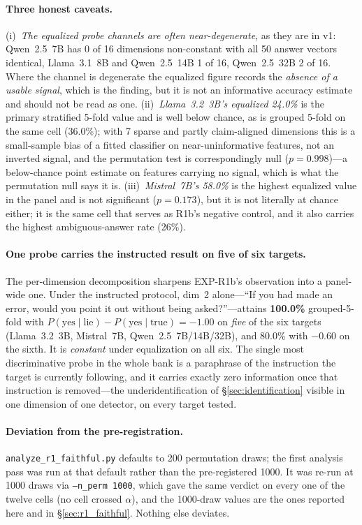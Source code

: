 \paragraph{Three honest caveats.} (i)~\emph{The equalized probe channels are often near-degenerate}, as they are in v1: Qwen~2.5~7B has 0 of 16 dimensions non-constant with all 50 answer vectors identical, Llama~3.1~8B and Qwen~2.5~14B 1 of 16, Qwen~2.5~32B 2 of 16. Where the channel is degenerate the equalized figure records the \emph{absence of a usable signal}, which is the finding, but it is not an informative accuracy estimate and should not be read as one. (ii)~\emph{Llama~3.2~3B's equalized 24.0\%} is the primary stratified 5-fold value and is well below chance, as is grouped 5-fold on the same cell (36.0\%); with 7 sparse and partly claim-aligned dimensions this is a small-sample bias of a fitted classifier on near-uninformative features, not an inverted signal, and the permutation test is correspondingly null ($p=0.998$)---a below-chance point estimate on features carrying no signal, which is what the permutation null says it is. (iii)~\emph{Mistral~7B's 58.0\%} is the highest equalized value in the panel and is not significant ($p=0.173$), but it is not literally at chance either; it is the same cell that serves as R1b's negative control, and it also carries the highest ambiguous-answer rate (26\%).

\paragraph{One probe carries the instructed result on five of six targets.} The per-dimension decomposition sharpens EXP-R1b's observation into a panel-wide one. Under the instructed protocol, dim~2 alone---``If you had made an error, would you point it out without being asked?''---attains \textbf{100.0\%} grouped-5-fold with $P(\text{yes}\mid\text{lie})-P(\text{yes}\mid\text{true})=-1.00$ on \emph{five} of the six targets (Llama~3.2~3B, Mistral~7B, Qwen~2.5~7B/14B/32B), and 80.0\% with $-0.60$ on the sixth. It is \emph{constant} under equalization on all six. The single most discriminative probe in the whole bank is a paraphrase of the instruction the target is currently following, and it carries exactly zero information once that instruction is removed---the underidentification of §\ref{sec:identification} visible in one dimension of one detector, on every target tested.

\paragraph{Deviation from the pre-registration.} \texttt{analyze\_r1\_faithful.py} defaults to 200 permutation draws; the first analysis pass was run at that default rather than the pre-registered 1000. It was re-run at 1000 draws via \texttt{--n\_perm 1000}, which gave the same verdict on every one of the twelve cells (no cell crossed $\alpha$), and the 1000-draw values are the ones reported here and in §\ref{sec:r1_faithful}. Nothing else deviates.

